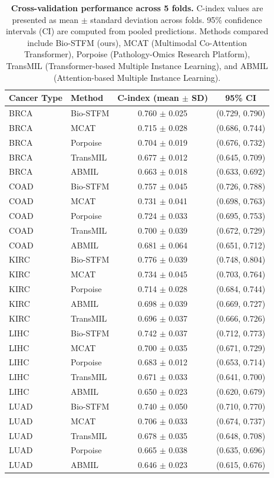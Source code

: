 \documentclass[11pt,a4paper]{article}
\begin{document}
\begin{table}[H]
\centering
\small
\caption{\textbf{Cross-validation performance across 5 folds.} C-index values are presented as mean $\pm$ standard deviation across folds. 95\% confidence intervals (CI) are computed from pooled predictions. Methods compared include Bio-STFM (ours), MCAT (Multimodal Co-Attention Transformer), Porpoise (Pathology-Omics Research Platform), TransMIL (Transformer-based Multiple Instance Learning), and ABMIL (Attention-based Multiple Instance Learning).}
\label{tab:s2_cv_results}
\begin{tabular}{@{}llcc@{}}
\toprule
\textbf{Cancer Type} & \textbf{Method} & \textbf{C-index (mean $\pm$ SD)} & \textbf{95\% CI} \\
\midrule
BRCA & Bio-STFM & 0.760 $\pm$ 0.025 & (0.729, 0.790) \\
BRCA & MCAT & 0.715 $\pm$ 0.028 & (0.686, 0.744) \\
BRCA & Porpoise & 0.704 $\pm$ 0.019 & (0.676, 0.732) \\
BRCA & TransMIL & 0.677 $\pm$ 0.012 & (0.645, 0.709) \\
BRCA & ABMIL & 0.663 $\pm$ 0.018 & (0.633, 0.692) \\
\addlinespace[0.5ex]
COAD & Bio-STFM & 0.757 $\pm$ 0.045 & (0.726, 0.788) \\
COAD & MCAT & 0.731 $\pm$ 0.041 & (0.698, 0.763) \\
COAD & Porpoise & 0.724 $\pm$ 0.033 & (0.695, 0.753) \\
COAD & TransMIL & 0.700 $\pm$ 0.039 & (0.672, 0.729) \\
COAD & ABMIL & 0.681 $\pm$ 0.064 & (0.651, 0.712) \\
\addlinespace[0.5ex]
KIRC & Bio-STFM & 0.776 $\pm$ 0.039 & (0.748, 0.804) \\
KIRC & MCAT & 0.734 $\pm$ 0.045 & (0.703, 0.764) \\
KIRC & Porpoise & 0.714 $\pm$ 0.028 & (0.684, 0.744) \\
KIRC & ABMIL & 0.698 $\pm$ 0.039 & (0.669, 0.727) \\
KIRC & TransMIL & 0.696 $\pm$ 0.037 & (0.666, 0.726) \\
\addlinespace[0.5ex]
LIHC & Bio-STFM & 0.742 $\pm$ 0.037 & (0.712, 0.773) \\
LIHC & MCAT & 0.700 $\pm$ 0.035 & (0.671, 0.729) \\
LIHC & Porpoise & 0.683 $\pm$ 0.012 & (0.653, 0.714) \\
LIHC & TransMIL & 0.671 $\pm$ 0.033 & (0.641, 0.700) \\
LIHC & ABMIL & 0.650 $\pm$ 0.023 & (0.620, 0.679) \\
\addlinespace[0.5ex]
LUAD & Bio-STFM & 0.740 $\pm$ 0.050 & (0.710, 0.770) \\
LUAD & MCAT & 0.706 $\pm$ 0.033 & (0.674, 0.737) \\
LUAD & TransMIL & 0.678 $\pm$ 0.035 & (0.648, 0.708) \\
LUAD & Porpoise & 0.665 $\pm$ 0.038 & (0.635, 0.696) \\
LUAD & ABMIL & 0.646 $\pm$ 0.023 & (0.615, 0.676) \\
\bottomrule
\end{tabular}
\end{table}
\end{document}
